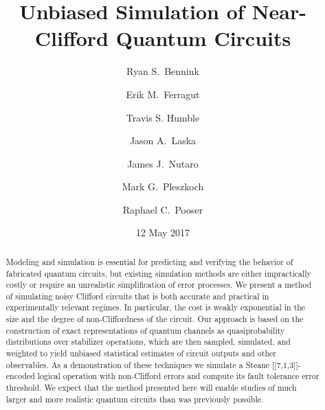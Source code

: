 \documentclass[twocolumn,pra]{revtex4}
\date{12 May 2017}
\begin{document}
\newcommand{\ceil}[1]{\left\lceil #1 \right\rceil}

\title{Unbiased Simulation of Near-Clifford Quantum Circuits}
\author{Ryan S.~Bennink}
\author{Erik M.~Ferragut}
\author{Travis S. Humble}
\author{Jason A.~Laska}
\author{James J.~Nutaro}
\author{Mark G.~Pleszkoch}
\author{Raphael C.~Pooser}

\begin{abstract}
Modeling and simulation is essential for predicting and verifying the behavior of fabricated quantum circuits, but existing simulation methods are either impractically costly or require an unrealistic simplification of error processes. We present a method of simulating noisy Clifford circuits that is both accurate and practical in experimentally relevant regimes. In particular, the cost is weakly exponential in the size and the degree of non-Cliffordness of the circuit. Our approach is based on the construction of exact representations of quantum channels as quasiprobability distributions over stabilizer operations, which are then sampled, simulated, and weighted to yield unbiased statistical estimates of circuit outputs and other observables.  As a demonstration of these techniques we simulate a Steane [[7,1,3]]-encoded logical operation with non-Clifford errors and compute its fault tolerance error threshold. We expect that the method presented here will enable studies of much larger and more realistic quantum circuits than was previously possible. 
\end{abstract}

\maketitle

\end{document}
